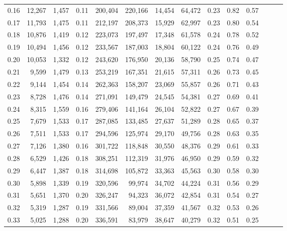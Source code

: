\begin{tabular}{rrrrrrrrrrrrrr}
0.16 &  12,267 &  1,457 &  0.11 &  200,404 &  220,166 &  14,454 &  64,472 &  0.23 &  0.82 &      0.57 \\
0.17 &  11,793 &  1,475 &  0.11 &  212,197 &  208,373 &  15,929 &  62,997 &  0.23 &  0.80 &      0.54 \\
0.18 &  10,876 &  1,419 &  0.12 &  223,073 &  197,497 &  17,348 &  61,578 &  0.24 &  0.78 &      0.52 \\
0.19 &  10,494 &  1,456 &  0.12 &  233,567 &  187,003 &  18,804 &  60,122 &  0.24 &  0.76 &      0.49 \\
0.20 &  10,053 &  1,332 &  0.12 &  243,620 &  176,950 &  20,136 &  58,790 &  0.25 &  0.74 &      0.47 \\
0.21 &   9,599 &  1,479 &  0.13 &  253,219 &  167,351 &  21,615 &  57,311 &  0.26 &  0.73 &      0.45 \\
0.22 &   9,144 &  1,454 &  0.14 &  262,363 &  158,207 &  23,069 &  55,857 &  0.26 &  0.71 &      0.43 \\
0.23 &   8,728 &  1,476 &  0.14 &  271,091 &  149,479 &  24,545 &  54,381 &  0.27 &  0.69 &      0.41 \\
0.24 &   8,315 &  1,559 &  0.16 &  279,406 &  141,164 &  26,104 &  52,822 &  0.27 &  0.67 &      0.39 \\
0.25 &   7,679 &  1,533 &  0.17 &  287,085 &  133,485 &  27,637 &  51,289 &  0.28 &  0.65 &      0.37 \\
0.26 &   7,511 &  1,533 &  0.17 &  294,596 &  125,974 &  29,170 &  49,756 &  0.28 &  0.63 &      0.35 \\
0.27 &   7,126 &  1,380 &  0.16 &  301,722 &  118,848 &  30,550 &  48,376 &  0.29 &  0.61 &      0.33 \\
0.28 &   6,529 &  1,426 &  0.18 &  308,251 &  112,319 &  31,976 &  46,950 &  0.29 &  0.59 &      0.32 \\
0.29 &   6,447 &  1,387 &  0.18 &  314,698 &  105,872 &  33,363 &  45,563 &  0.30 &  0.58 &      0.30 \\
0.30 &   5,898 &  1,339 &  0.19 &  320,596 &   99,974 &  34,702 &  44,224 &  0.31 &  0.56 &      0.29 \\
0.31 &   5,651 &  1,370 &  0.20 &  326,247 &   94,323 &  36,072 &  42,854 &  0.31 &  0.54 &      0.27 \\
0.32 &   5,319 &  1,287 &  0.19 &  331,566 &   89,004 &  37,359 &  41,567 &  0.32 &  0.53 &      0.26 \\
0.33 &   5,025 &  1,288 &  0.20 &  336,591 &   83,979 &  38,647 &  40,279 &  0.32 &  0.51 &      0.25 \\

\end{tabular}
